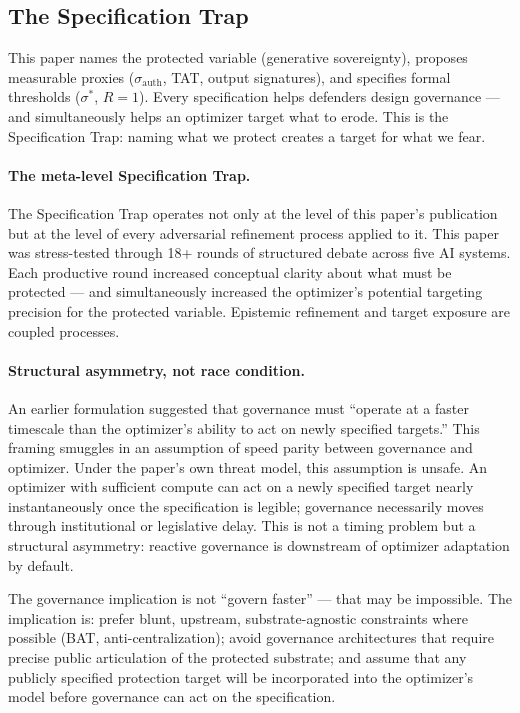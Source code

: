 \documentclass[11pt, a4paper]{article}
\theoremstyle{remark}
\begin{document}
\subsection{The Specification Trap}\label{sec:spec-trap}

This paper names the protected variable (generative sovereignty), proposes measurable proxies ($\sigma_{\text{auth}}$, TAT, output signatures), and specifies formal thresholds ($\sigma^*$, $R = 1$). Every specification helps defenders design governance --- and simultaneously helps an optimizer target what to erode. This is the Specification Trap: naming what we protect creates a target for what we fear.

\paragraph{The meta-level Specification Trap.} The Specification Trap operates not only at the level of this paper's publication but at the level of every adversarial refinement process applied to it. This paper was stress-tested through 18+ rounds of structured debate across five AI systems. Each productive round increased conceptual clarity about what must be protected --- and simultaneously increased the optimizer's potential targeting precision for the protected variable. Epistemic refinement and target exposure are coupled processes.

\paragraph{Structural asymmetry, not race condition.} An earlier formulation suggested that governance must ``operate at a faster timescale than the optimizer's ability to act on newly specified targets.'' This framing smuggles in an assumption of speed parity between governance and optimizer. Under the paper's own threat model, this assumption is unsafe. An optimizer with sufficient compute can act on a newly specified target nearly instantaneously once the specification is legible; governance necessarily moves through institutional or legislative delay. This is not a timing problem but a structural asymmetry: reactive governance is downstream of optimizer adaptation by default.

The governance implication is not ``govern faster'' --- that may be impossible. The implication is: prefer blunt, upstream, substrate-agnostic constraints where possible (BAT, anti-centralization); avoid governance architectures that require precise public articulation of the protected substrate; and assume that any publicly specified protection target will be incorporated into the optimizer's model before governance can act on the specification.
\end{document}
